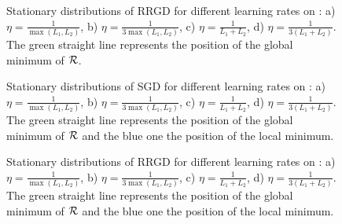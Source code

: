 \begin{figure}[h!]
	\centering
	\scalebox{0.45}{}
	\caption{Stationary distributions of RRGD for different learning rates on \exOne: a) $\eta=\frac{1}{\max(L_1,L_2)}$, b) $\eta=\frac{1}{3\max(L_1,L_2)}$, c) $\eta=\frac{1}{L_1+L_2}$, d) $\eta=\frac{1}{3(L_1+L_2)}$. The green straight line represents the position of the global minimum of $\mathcal{R}$.}
	\label{RRGD_ex1}
\end{figure}

\begin{figure}[h!]
	\centering
	\scalebox{0.45}{}
	\caption{Stationary distributions of SGD for different learning rates on \exTwo: a) $\eta=\frac{1}{\max(L_1,L_2)}$, b) $\eta=\frac{1}{3\max(L_1,L_2)}$, c) $\eta=\frac{1}{L_1+L_2}$, d) $\eta=\frac{1}{3(L_1+L_2)}$. The green straight line represents the position of the global minimum of $\mathcal{R}$ and the blue one the position of the local minimum.}
	\label{sgd_ex2}
\end{figure}

\begin{figure}[h!]
	\centering
	\scalebox{0.45}{}
	\caption{Stationary distributions of RRGD for different learning rates on \exTwo: a) $\eta=\frac{1}{\max(L_1,L_2)}$, b) $\eta=\frac{1}{3\max(L_1,L_2)}$, c) $\eta=\frac{1}{L_1+L_2}$, d) $\eta=\frac{1}{3(L_1+L_2)}$. The green straight line represents the position of the global minimum of $\mathcal{R}$ and the blue one the position of the local minimum.}
	\label{RRGD_ex2}
\end{figure}

